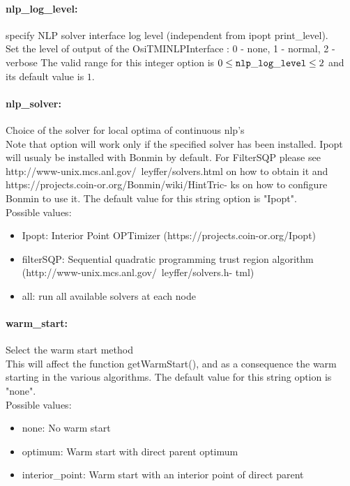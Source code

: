 \paragraph{nlp\_log\_level:}\label{sec:nlp_log_level} specify NLP solver interface log level (independent from ipopt print\_level). $\;$ \\
 Set the level of output of the OsiTMINLPInterface
: 0 - none, 1 - normal, 2 - verbose The valid range for this integer option is
$0 \le {\tt nlp\_log\_level } \le 2$
and its default value is $1$.


\paragraph{nlp\_solver:}\label{sec:nlp_solver} Choice of the solver for local optima of continuous nlp's $\;$ \\
 Note that option will work only if the specified
solver has been installed. Ipopt will usualy be
installed with Bonmin by default. For FilterSQP
please see
http://www-unix.mcs.anl.gov/~leyffer/solvers.html
on how to obtain it and
https://projects.coin-or.org/Bonmin/wiki/HintTric-
ks on how to configure Bonmin to use it.
The default value for this string option is "Ipopt".
\\ 
Possible values:
\begin{itemize}
   \item Ipopt: Interior Point OPTimizer
(https://projects.coin-or.org/Ipopt)
   \item filterSQP: Sequential quadratic programming trust region
algorithm
(http://www-unix.mcs.anl.gov/~leyffer/solvers.h-
tml)
   \item all: run all available solvers at each node
\end{itemize}

\paragraph{warm\_start:}\label{sec:warm_start} Select the warm start method $\;$ \\
 This will affect the function getWarmStart(), and
as a consequence the warm starting in the various
algorithms.
The default value for this string option is "none".
\\ 
Possible values:
\begin{itemize}
   \item none: No warm start
   \item optimum: Warm start with direct parent optimum
   \item interior\_point: Warm start with an interior point of direct
parent
\end{itemize}

